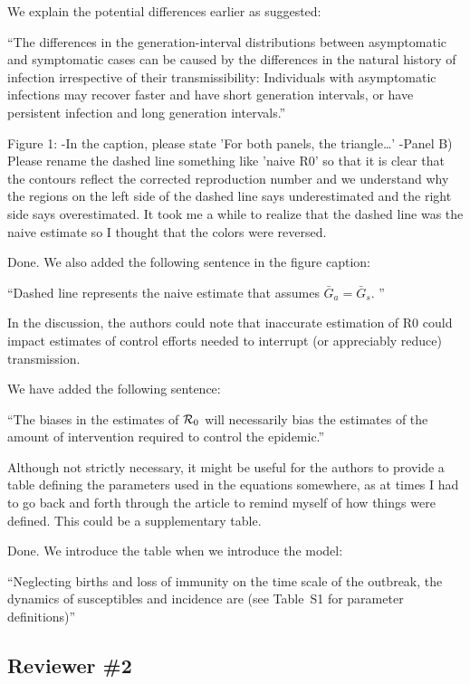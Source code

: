 \documentclass[12pt]{article}
\newcommand{\rev}{\subsection*}
\newcommand{\revtext}{\textsf}
\begin{document}
We explain the potential differences earlier as suggested:

``The differences in the generation-interval distributions between asymptomatic and symptomatic cases can be caused by the differences in the natural history of infection irrespective of their transmissibility:
Individuals with asymptomatic infections may recover faster and have short generation intervals, or have persistent infection and long generation intervals.''

\revtext{Figure 1:
-In the caption, please state 'For both panels, the triangle…'
-Panel B) Please rename the dashed line something like 'naive R0' so that it is clear that the contours reflect the corrected reproduction number and we understand why the regions on the left side of the dashed line says underestimated and the right side says overestimated.  It took me a while to realize that the dashed line was the naive estimate so I thought that the colors were reversed.}

Done. We also added the following sentence in the figure caption:

``Dashed line represents the naive estimate that assumes $\bar G_a = \bar G_s$. ''

\revtext{In the discussion, the authors could note that inaccurate estimation of R0 could impact estimates of control efforts needed to interrupt (or appreciably reduce) transmission.}

We have added the following sentence:

``The biases in the estimates of ${\cal{R}}_0$ will necessarily bias the estimates of the amount of intervention required to control the epidemic.''

\revtext{Although not strictly necessary, it might be useful for the authors to provide a table defining the parameters used in the equations somewhere, as at times I had to go back and forth through the article to remind myself of how things were defined.  This could be a supplementary table.}

Done. We introduce the table when we introduce the model:

``Neglecting births and loss of immunity on the time scale of the outbreak, the dynamics of susceptibles and incidence are (see Table~S1 for parameter definitions)''

\rev{Reviewer \#2} 
\end{document}
